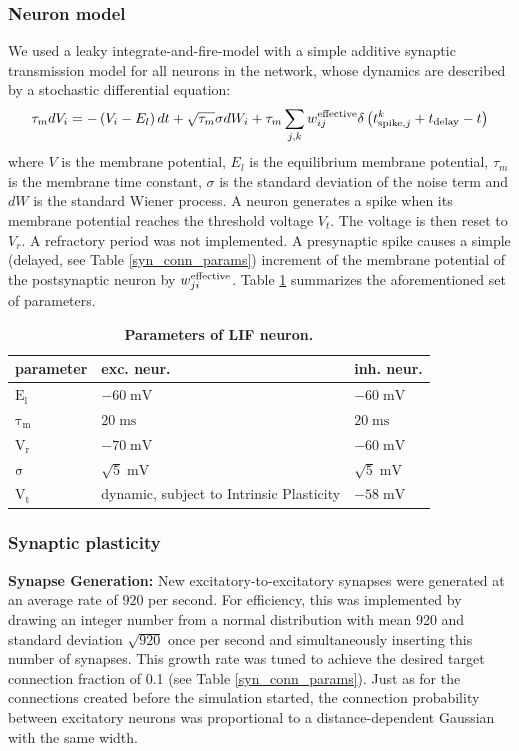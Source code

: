 \documentclass[10pt,letterpaper]{article}
\begin{document}
\subsubsection*{Neuron model}
We used a leaky integrate-and-fire-model with a simple additive synaptic transmission model for all neurons in the network, whose dynamics are described by a stochastic differential equation:
\begin{equation}
{\tau_m}dV_i = -\left( V_i-E_l \right) dt + \sqrt{\tau_m} \sigma dW_i + \tau_m \sum_{j,k} w^{\rm effective}_{ij}\delta \left( t^k_{\mathrm{spike},j} + t_{\rm delay} - t \right)
\label{LIF_Dynamics}
\end{equation}
where $V$ is the membrane potential, $E_l$ is the equilibrium membrane potential, $\tau_m$ is the membrane time constant, $\sigma$ is the standard deviation of the noise term and $dW$ is the standard Wiener process. A neuron generates a spike when its membrane potential reaches the threshold voltage $V_t$. The voltage is then reset to $V_r$. A refractory period was not implemented. A presynaptic spike causes a simple (delayed, see Table \ref{syn_conn_params}) increment of the membrane potential of the postsynaptic neuron by $w^{\rm effective}_{ji}$. Table \ref{LIF_neuron_params} summarizes the aforementioned set of parameters.
\begin{table}
\caption{\bf Parameters of LIF neuron.}
\begin{tabular}{|l|l|l|}
\hline
\textbf{parameter} & \textbf{exc. neur.} & \textbf{inh. neur.}\\ \hline
$\mathrm{E_l}$ & $\mathrm{-60\;mV}$ & $\mathrm{-60\;mV}$ \\ \hline
$\mathrm{\tau_m}$ & $\mathrm{20\;ms}$ & $\mathrm{20\;ms}$ \\ \hline
$\mathrm{V_r}$ & $\mathrm{-70\;mV}$ & $\mathrm{-60\;mV}$ \\ \hline
$\mathrm{\sigma}$ & $\mathrm{\sqrt{5}\;mV}$ & $\mathrm{\sqrt{5}\;mV}$ \\ \hline
$\mathrm{V_t}$ & dynamic, subject to Intrinsic Plasticity & $\mathrm{-58\;mV}$ \\ 
\hline
\end{tabular}
\label{LIF_neuron_params}
\end{table}


\subsubsection*{Synaptic plasticity}\label{Section_Methods_Syn_Plast}
\textbf{Synapse Generation:} New excitatory-to-excitatory synapses were generated at an average rate of $920$ per second. For efficiency, this was implemented by drawing an integer number from a normal distribution with mean 920 and standard deviation $\sqrt{920}$ once per second and simultaneously inserting this number of synapses. This growth rate was tuned to achieve the desired target connection fraction of 0.1 (see Table \ref{syn_conn_params}). Just as for the connections created before the simulation started, the connection probability between excitatory neurons was proportional to a distance-dependent Gaussian with the same width.
\end{document}
